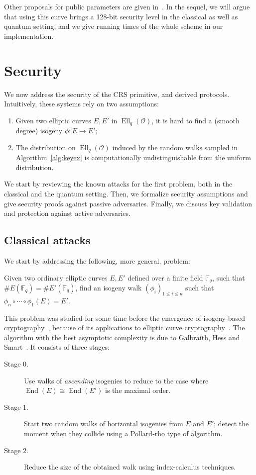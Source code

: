 \documentclass{llncs}
\newcommand{\F}{\mathbb{F}}
\renewcommand{\O}{\mathcal{O}}
\DeclareMathOperator{\End}{End}
\DeclareMathOperator{\Ell}{Ell}
\begin{document}
Other proposals for public parameters are given in~\cite{todo:memoire}.
In the sequel, we will argue that using this curve brings a 128-bit security level
in the classical as well as quantum setting, and we give running times of the whole
scheme in our implementation.

\section{Security}
\label{sec:sec}

We now address the security of the CRS primitive, and derived
protocols. Intuitively, these systems rely on two assumptions:
\begin{enumerate}
\item Given two elliptic curves $E,E'$ in $\Ell_q(\O)$, it is hard to
  find a (smooth degree) isogeny $ϕ:E→E'$;
\item The distribution on $\Ell_q(\O)$ induced by the random walks
  sampled in Algorithm~\ref{alg:keyex} is computationally
  undistinguishable from the uniform distribution.
\end{enumerate}

We start by reviewing the known attacks for the first problem, both in
the classical and the quantum setting. Then, we formalize security
assumptions and give security proofs against passive adversaries.
Finally, we discuss key validation and protection against active
adversaries.

\subsection{Classical attacks}
\label{sec:classical-attacks}

We start by addressing the following, more general, problem:

\begin{problem}
\label{prob:isog}
  Given two ordinary elliptic curves $E,E'$ defined over a finite
  field $\F_q$, such that $\#E(\F_q)=\#E'(\F_q)$, find an isogeny walk
  $(ϕ_i)_{1≤i≤n}$ such that $ϕ_n∘\cdots∘ϕ_1(E)=E'$.
\end{problem}

This problem was studied for some time before the emergence of
isogeny-based cryptography~\cite{Gal,GHS,galbraith+stolbunov11},
because of its applications to elliptic curve
cryptography~\cite{GHS,teske06,jao+miller+venkatesan09}.  The
algorithm with the best asymptotic complexity is due to Galbraith,
Hess and Smart~\cite{GHS}. It consists of three stages:
\begin{description}
\item[Stage 0.] Use walks of \emph{ascending} isogenies to reduce to the case where
  $\End(E)\cong\End(E')$ is the maximal order.
\item[Stage 1.] Start two random walks of horizontal isogenies 
  from $E$ and $E'$; detect the
  moment when they collide using a Pollard-rho type of algorithm.
\item[Stage 2.] Reduce the size of the obtained walk using
  index-calculus techniques.
\end{description}
\end{document}
